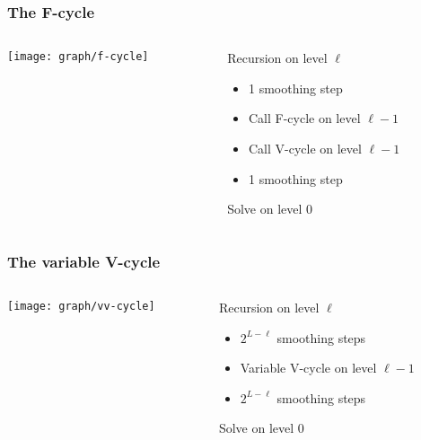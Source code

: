 \begin{frame}
  \frametitle{The F-cycle}
  \begin{columns}
    \begin{column}{.5\textwidth}
    \texttt{[image: graph/f-cycle]}
    \end{column}
    \begin{column}{.5\textwidth}
      Recursion on level $\ell$
      \begin{itemize}
      \item 1 smoothing step
      \item Call F-cycle on level $\ell-1$
      \item Call V-cycle on level $\ell-1$
      \item 1 smoothing step
      \end{itemize}
      Solve on level 0
    \end{column}
  \end{columns}
  \begin{center}
  \end{center}
\end{frame}


\begin{frame}
  \frametitle{The variable V-cycle}
  \begin{columns}
    \begin{column}{.5\textwidth}
    \texttt{[image: graph/vv-cycle]}      
    \end{column}
    \begin{column}{.5\textwidth}
      Recursion on level $\ell$
      \begin{itemize}
      \item $2^{L-\ell}$ smoothing steps
      \item Variable V-cycle on level $\ell-1$
      \item $2^{L-\ell}$ smoothing steps
      \end{itemize}
      Solve on level 0
    \end{column}
  \end{columns}
  \begin{center}
  \end{center}
\end{frame}

